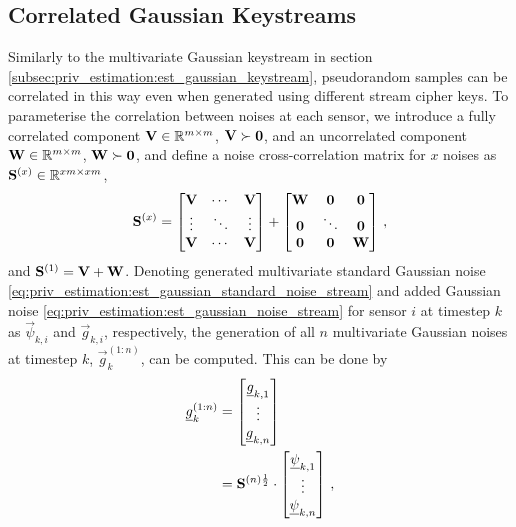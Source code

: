 \subsection{Correlated Gaussian Keystreams}\label{subsec:priv_estimation:fus_gaussian_keystreams}
Similarly to the multivariate Gaussian keystream in section \ref{subsec:priv_estimation:est_gaussian_keystream}, pseudorandom samples can be correlated in this way even when generated using different stream cipher keys. To parameterise the correlation between noises at each sensor, we introduce a fully correlated component ${{\mathbf{V}}}\in\mathbb{R}^{m\times m}$, ${{\mathbf{V}}}\succ{\ensuremath{{\mathbf{0}}}}$, and an uncorrelated component ${{\mathbf{W}}}\in\mathbb{R}^{m\times m}$, ${{\mathbf{W}}}\succ{\ensuremath{{\mathbf{0}}}}$, and define a noise cross-correlation matrix for $x$ noises as ${{\mathbf{S}}}^{(x)} \in \mathbb{R}^{xm\times xm}$,
\begin{equation}\label{eq:priv_estimation:fus_noise_correlation_matrix}
    {\ensuremath{{\mathbf{S}}}}^{(x)}=
    \begin{bmatrix}
        {\ensuremath{{\mathbf{V}}}} & \cdots & {{\mathbf{V}}}\\
        \vdots & \ddots & \vdots\\
        {{\mathbf{V}}} & \cdots & {{\mathbf{V}}}\\
    \end{bmatrix}+
    \begin{bmatrix}
        {\ensuremath{{\mathbf{W}}}} & {{\mathbf{0}}} & {{\mathbf{0}}}\\
        {{\mathbf{0}}} & \ddots & {{\mathbf{0}}}\\
        {{\mathbf{0}}} & {{\mathbf{0}}} & {{\mathbf{W}}}\\
    \end{bmatrix}\,,
\end{equation}
and ${{\mathbf{S}}}^{(1)}={{\mathbf{V}}}+{{\mathbf{W}}}$. Denoting generated multivariate standard Gaussian noise \eqref{eq:priv_estimation:est_gaussian_standard_noise_stream} and added Gaussian noise \eqref{eq:priv_estimation:est_gaussian_noise_stream} for sensor $i$ at timestep $k$ as $\vec{\psi}_{k, i}$ and $\vec{g}_{k, i}$, respectively, the generation of all $n$ multivariate Gaussian noises at timestep $k$, $\vec{g}_k^{(1:n)}$, can be computed. This can be done by
\begin{equation}\label{eq:priv_estimation:fus_all_correlated_noises_generation}
    \begin{split}
        {\underline{g}}_k^{(1:n)}&=
        \begin{bmatrix}
            {\underline{g}}_{k,1}\\
            \vdots\\
            {\underline{g}}_{k,n}
        \end{bmatrix}\\
        &={{\mathbf{S}}}^{(n)\frac{1}{2}}\cdot
        \begin{bmatrix}
            {\underline{\psi}}_{k,1}\\
            \vdots\\
            {\underline{\psi}}_{k,n}
        \end{bmatrix}\,,
    \end{split}
\end{equation}
